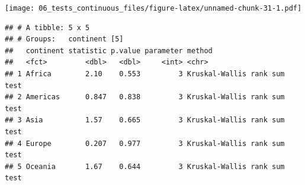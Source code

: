 \documentclass[12pt,]{krantz}
\makeatletter
\newenvironment{Shaded}{\begin{snugshade}}{\end{snugshade}}
\newcommand{\CommentTok}[1]{\textcolor[rgb]{0.56,0.35,0.01}{\textit{#1}}}
\newcommand{\DataTypeTok}[1]{\textcolor[rgb]{0.13,0.29,0.53}{#1}}
\newcommand{\DecValTok}[1]{\textcolor[rgb]{0.00,0.00,0.81}{#1}}
\newcommand{\KeywordTok}[1]{\textcolor[rgb]{0.13,0.29,0.53}{\textbf{#1}}}
\newcommand{\NormalTok}[1]{#1}
\newcommand{\OperatorTok}[1]{\textcolor[rgb]{0.81,0.36,0.00}{\textbf{#1}}}
\newcommand{\StringTok}[1]{\textcolor[rgb]{0.31,0.60,0.02}{#1}}
\newenvironment{kframe}{%
\medskip{}
\setlength{\fboxsep}{.8em}
 \def\at@end@of@kframe{}%
 \ifinner\ifhmode%
  \def\at@end@of@kframe{\end{minipage}}%
  \begin{minipage}{\columnwidth}%
 \fi\fi%
 \def\FrameCommand##1{\hskip\@totalleftmargin \hskip-\fboxsep
 \colorbox{shadecolor}{##1}\hskip-\fboxsep
     \hskip-\linewidth \hskip-\@totalleftmargin \hskip\columnwidth}%
 \MakeFramed {\advance\hsize-\width
   \@totalleftmargin\z@ \linewidth\hsize
   \@setminipage}}%
 {\par\unskip\endMakeFramed%
 \at@end@of@kframe}
\renewenvironment{Shaded}{\begin{kframe}}{\end{kframe}}
\theoremstyle{definition}
\theoremstyle{definition}
\theoremstyle{definition}
\theoremstyle{remark}
\makeatother
\begin{document}
\begin{Shaded}
\end{Shaded}

\texttt{[image: 06\_tests\_continuous\_files/figure-latex/unnamed-chunk-31-1.pdf]}

\begin{Shaded}
\end{Shaded}

\begin{verbatim}
## # A tibble: 5 x 5
## # Groups:   continent [5]
##   continent statistic p.value parameter method                      
##   <fct>         <dbl>   <dbl>     <int> <chr>                       
## 1 Africa        2.10    0.553         3 Kruskal-Wallis rank sum test
## 2 Americas      0.847   0.838         3 Kruskal-Wallis rank sum test
## 3 Asia          1.57    0.665         3 Kruskal-Wallis rank sum test
## 4 Europe        0.207   0.977         3 Kruskal-Wallis rank sum test
## 5 Oceania       1.67    0.644         3 Kruskal-Wallis rank sum test
\end{verbatim}
\end{document}
